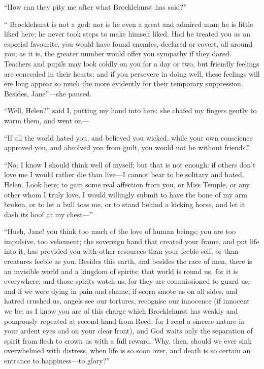 \enquote{How can they pity me after what \Mr{} Brocklehurst has said?}

\enquote{\Mr{} Brocklehurst is not a god: nor is he even a great and
	admired man: he is little liked here; he never took steps to make
	himself liked. Had he treated you as an especial favourite, you would
	have found enemies, declared or covert, all around you; as it is, the
	greater number would offer you sympathy if they dared. Teachers and
	pupils may look coldly on you for a day or two, but friendly feelings
	are concealed in their hearts; and if you persevere in doing well, these
	feelings will ere long appear so much the more evidently for their
	temporary suppression. Besides, Jane}---she paused.

\enquote{Well, Helen?} said I, putting my hand into hers: she chafed my
fingers gently to warm them, and went on---

\enquote{If all the world hated you, and believed you wicked, while your
	own conscience approved you, and absolved you from guilt, you would not
	be without friends.}

\enquote{No; I know I should think well of myself; but that is not
	enough: if others don't love me I would rather die than live---I cannot
	bear to be solitary and hated, Helen. Look here; to gain some real
	affection from you, or Miss Temple, or any other whom I truly love, I
	would willingly submit to have the bone of my arm broken, or to let a
	bull toss me, or to stand behind a kicking horse, and let it dash its
	hoof at my chest---}

\enquote{Hush, Jane! you think too much of the love of human beings; you
	are too impulsive, too vehement; the sovereign hand that created your
	frame, and put life into it, has provided you with other resources than
	your feeble self, or than creatures feeble as you. Besides this earth,
	and besides the race of men, there is an invisible world and a kingdom
	of spirits: that world is round us, for it is everywhere; and those
	spirits watch us, for they are commissioned to guard us; and if we were
	dying in pain and shame, if scorn smote us on all sides, and hatred
	crushed us, angels see our tortures, recognise our innocence (if
	innocent we be: as I know you are of this charge which \Mr{} Brocklehurst
	has weakly and pompously repeated at second-hand from \Mrs{} Reed; for I
	read a sincere nature in your ardent eyes and on your clear front), and
	God waits only the separation of spirit from flesh to crown us with a
	full reward. Why, then, should we ever sink overwhelmed with distress,
	when life is so soon over, and death is so certain an entrance to
	happiness---to glory?}

